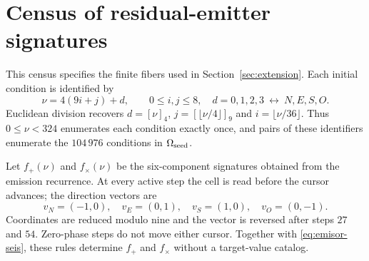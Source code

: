 \section{Census of residual-emitter signatures}
\label{app:firmas-emision}

This census specifies the finite fibers used in Section~\ref{sec:extension}.
Each initial condition is identified by
\[
 \nu=4(9i+j)+d,\qquad 0\leq i,j\leq8,\quad
 d=0,1,2,3\ \longleftrightarrow\ N,E,S,O.
\]
Euclidean division recovers \(d=[\nu]_4\), \(j=[\lfloor\nu/4\rfloor]_9\)
and \(i=\lfloor\nu/36\rfloor\). Thus \(0\leq\nu<324\) enumerates
each condition exactly once, and pairs of these identifiers enumerate
the \(104\,976\) conditions in \(\Omega_{\rm seed}\).

Let \(f_+(\nu)\) and \(f_\times(\nu)\) be the six-component signatures
obtained from the emission recurrence. At every active step the cell is read
before the cursor advances; the direction vectors are
\[
 v_N=(-1,0),\quad v_E=(0,1),\quad v_S=(1,0),\quad v_O=(0,-1).
\]
Coordinates are reduced modulo nine and the vector is reversed after
steps \(27\) and \(54\). Zero-phase steps do not move either cursor.
Together with \eqref{eq:emisor-seis}, these rules determine
\(f_+\) and \(f_\times\) without a target-value catalog.

